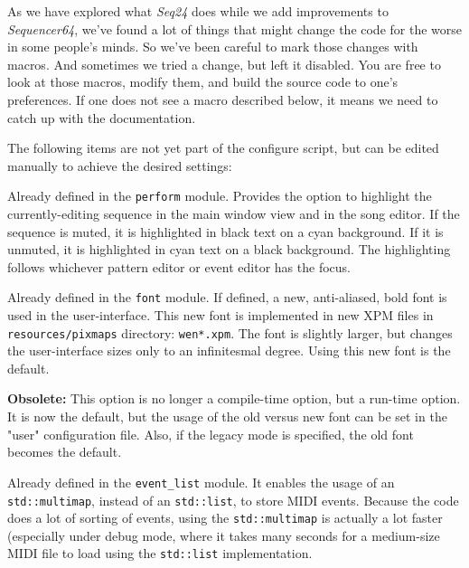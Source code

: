    As we have explored what \textsl{Seq24} does while we add improvements to
   \textsl{Sequencer64}, we've found a lot of things that might change the code
   for the worse in some people's minds.  So we've been careful to mark those
   changes with macros.  And sometimes we tried a change, but left it
   disabled.  You are free to look at those macros, modify them, and build
   the source code to one's preferences.  If one does not see a macro described
   below, it means we need to catch up with the documentation.

   The following items are not yet part of the configure script, but can
   be edited manually to achieve the desired settings:

   \setcounter{ItemCounter}{0}      %
   
        Already defined in the \texttt{perform} module.
        Provides the option to highlight the currently-editing sequence in the
        main window view and in the song editor.  If the sequence is muted, it
        is highlighted in black text on a cyan background.  If it is unmuted,
        it is highlighted in cyan text on a black background.  The highlighting
        follows whichever pattern editor or event editor has the focus.

        Already defined in the \texttt{font} module.
        If defined, a new, anti-aliased,
        bold font is used in the user-interface.  This new font is implemented
        in new XPM files in \texttt{resources/pixmaps} directory:
        \texttt{wen*.xpm}.  The font is slightly
        larger, but changes the user-interface sizes only to an infinitesmal
        degree.  Using this new font is the default.

        \textbf{Obsolete:}
        This option is no longer a compile-time option, but a run-time option.
        It is now the default, but the usage of the old versus new font can be
        set in the "user" configuration file.
        Also, if the legacy mode is specified, the old font becomes the
        default.

        Already defined in the \texttt{event\_list} module.
        It enables the usage of an
        \texttt{std::multimap}, instead of an \texttt{std::list},
        to store MIDI events.  Because
        the code does a lot of sorting of events, using the
        \texttt{std::multimap} is actually a lot faster (especially under debug
        mode, where it takes
        many seconds for a medium-size MIDI file to load using the
        \texttt{std::list} implementation.

